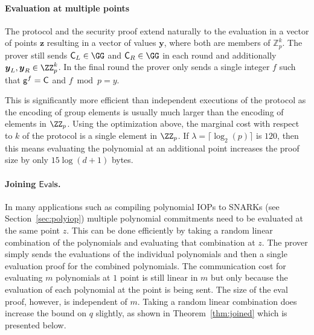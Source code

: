 
\paragraph{Evaluation at multiple points}
The protocol and the security proof extend naturally to the evaluation in a vector of points $\boldsymbol{z}$ resulting in a vector of values $\boldsymbol{y}$, where both are members of $\mathbb{Z}_p^k$. The prover still sends $\gr{C}_L\in \GG$ and $\gr{C}_R\in \GG$ in each round and additionally $\boldsymbol{y}_L,\boldsymbol{y}_R \in \ZZ^k_p$. In the final round the prover only sends a single integer $f$ such that $\mathsf{g}^{f}=\mathsf{C}$ and $f \bmod p=y$.

This is significantly more efficient than independent executions of the protocol as the encoding of group elements is usually much larger than the encoding of elements in $\ZZ_p$. Using the optimization above, the marginal cost with respect to $k$ of the protocol is a single element in $\ZZ_p$. If $\lambda=\lceil\log_2(p)\rceil$ is $120$, then this means evaluating the polynomial at an additional point increases the proof size by only $15\log(d+1)$ bytes.

\paragraph{Joining $\mathsf{Eval}$s.} 
In many applications such as compiling polynomial IOPs to SNARKs (see Section~\ref{sec:polyiop}) multiple polynomial commitments need to be evaluated at the same point $z$. 
This can be done efficiently by taking a random linear combination of the polynomials and evaluating that combination at $z$. The prover simply sends the evaluations of the individual polynomials and then a single evaluation proof for the combined polynomials. The communication cost for evaluating $m$ polynomials at $1$ point is still linear in $m$ but only because the evaluation of each polynomial at the point is being sent. The size of the eval proof, however, is independent of $m$. 
Taking a random linear combination does increase the bound on $q$ slightly, as shown in Theorem~\ref{thm:joined} which is presented below.

